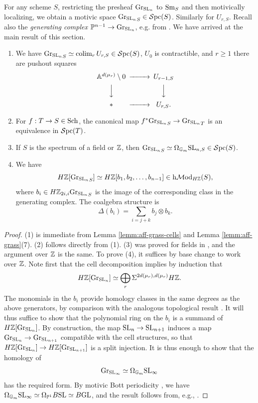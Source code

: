 \documentclass{amsart}
\numberwithin{proposition}{section}
\numberwithin{equation}{section}
\newcommand{\Gr}[1]{{\mathrm{Gr}_{#1}}}
\def\h{\mathrm h}
\begin{document}
For any scheme $S$, restricting the presheaf $\Gr{\SL_n}$ to ${\mathrm{S}\mathrm{m}}_S$ and then motivically localizing, we obtain a motivic space $\Gr{\SL_n}_S \in \Spc(S)$.
Similarly for $U_{r,S}$.
Recall also the \emph{generating complex} $\P^{n-1} \to \Gr{\SL_n}$, e.g. from \cite[\S5, Example~(i), and \S6]{littig2011generating}.
We have arrived at the main result of this section.
\begin{proposition} \label{prop:aff-grass}
\begin{enumerate}
\item We have $\Gr{\SL_n}_S \wequi \colim_r U_{r,S} \in \Spc(S)$, $U_0$ is contractible, and $r\ge1$ there are pushout squares
\begin{equation*}
\begin{CD}
\A^{d(\mu_r)} \setminus 0 @>>> U_{r-1,S} \\
@VVV         @VVV \\
* @>>> U_{r,S}.
\end{CD}
\end{equation*}
\item For $f: T \to S \in \mathrm{S}\mathrm{ch}{}$, the canonical map $f^* \Gr{\SL_n}_S \to \Gr{\SL_n}_T$ is an equivalence in $\mathcal{S}\mathrm{pc}{}(T)$.
\item If $S$ is the spectrum of a field or $\mathbb{Z}$, then $\Gr{\SL_n}_S \wequi \Omega_\Gm \SL_{n,S} \in \Spc(S)$.
\item We have \[ H\Z[\Gr{\SL_n}_S] \wequi H\Z[b_1, b_2, \dots, b_{n-1}] \in \h\Mod_{H\Z}(S), \] where $b_i \in H\Z_{2i,i}\Gr{\SL_n}_S$ is the image of the corresponding class in the generating complex.
  The coalgebra structure is \[ \Delta(b_i) = \sum_{i=j+k} b_j \otimes b_k. \]
\end{enumerate}
\end{proposition}
\begin{proof}
(1) is immediate from Lemma \ref{lemm:aff-grass-cells} and Lemma \ref{lemm:aff-grass}(7).
(2) follows directly from (1).
(3) was proved for fields in \cite[Theorem 15]{bachmann-grassmann}, and the argument over $\mathbb{Z}$ is the same.
To prove (4), it suffices by base change to work over $\mathbb{Z}$.
Note first that the cell decomposition implies by induction that \[ H\Z[\Gr{\SL_n}] \wequi \bigoplus_r \Sigma^{2d(\mu_r),d(\mu_r)}H\Z. \]
The monomials in the $b_i$ provide homology classes in the same degrees as the above generators, by comparison with the analogous topological result \cite[Proposition~10.27.6]{neisendorfer-algebraic}.
It will thus suffice to show that the polynomial ring on the $b_i$ is a summand of $H\Z[\Gr{\SL_n}]$.
By construction, the map $\mathrm{SL}_n \to \mathrm{SL}_{n+1}$ induces a map $\Gr{\SL_n} \to \Gr{\SL_{n+1}}$ compatible with the cell structures, so that $H\Z[\Gr{\SL_n}] \to H\Z[\Gr{\SL_{n+1}}]$ is a split injection.
It is thus enough to show that the homology of \[ \Gr{\SL_\infty} \wequi \Omega_\Gm \SL_\infty \] has the required form.
By motivic Bott periodicity \cite[\S4, Theorem~3.13]{A1-homotopy-theory}, we have $\Omega_{\mathbb{G}_m}\mathrm{SL}_\infty \simeq \Omega_{\mathbb P^1}B\mathrm{SL} \simeq B\mathrm{GL}$, and the result follows from, e.g., \cite[Proposition~6.2(ii)(b)]{naumann2009motivic}.
\end{proof}
\end{document}

